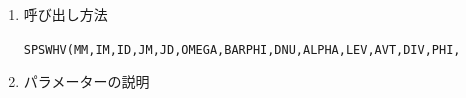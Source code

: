 \documentclass[a4j,fleqn]{jarticle}
\begin{document}
\begin{enumerate}
さて, $\Phi=\bar\Phi+\Phi'$と$\Phi$を平均部分と擾乱部分に分離すると,
上記の方程式系は以下のように書きかえられる:
\begin{equation}
\dot{q}=-\frac{\partial A}{\cos\varphi\partial\lambda}
-\frac{\partial(B\cos\varphi)}{\cos\varphi\partial\varphi}
+\frac{\nu}{\bar\Phi}\{2(\nabla^2+1)\hat\zeta_{\Phi'}
-\nabla^2(\Phi'\hat\zeta)\}
+\nu(\nabla^2+2)\hat\zeta,
\end{equation}
\begin{eqnarray}
\dot{D}=\frac{\partial B}{\cos\varphi\partial\lambda}
-\frac{\partial(A\cos\varphi)}{\cos\varphi\partial\varphi}
-\nabla^2(E+\frac{\nu}{\bar\Phi}\alpha\Phi'\hat D)
+\frac{\nu}{\bar\Phi}\{2(\nabla^2+1)\hat D_{\Phi'}\}\nonumber\\
-\nabla^2\Phi'+\nu\left\{(2-\alpha)\nabla^2+2\right\}\hat D,
\end{eqnarray}
\begin{equation}
\dot{\Phi'}=-D_{\Phi'}-\bar\Phi D.
\end{equation}
本サブルーチンは, 上記の$q,D,\Phi$のスペクトル展開係数
$q^m_n,D^m_n,\Phi^m_n$および$\bar\Phi,\nu,\alpha$を入力として,
$\dot{q},\dot{D},\dot{\Phi}$の非線形部分:
\begin{equation}
\dot{q}_{非線形}=-\frac{\partial A}{\cos\varphi\partial\lambda}
-\frac{\partial(B\cos\varphi)}{\cos\varphi\partial\varphi}
+\frac{\nu}{\bar\Phi}\{2(\nabla^2+1)\hat\zeta_{\Phi'}
-\nabla^2(\Phi'\hat\zeta)\},
\end{equation}
\begin{eqnarray}
\dot{D}_{非線形}=\frac{\partial B}{\cos\varphi\partial\lambda}
-\frac{\partial(A\cos\varphi)}{\cos\varphi\partial\varphi}
-\nabla^2(E+\frac{\nu}{\bar\Phi}\alpha\Phi'\hat D)
+\frac{\nu}{\bar\Phi}\{2(\nabla^2+1)\hat D_{\Phi'}\}
\end{eqnarray}
\begin{equation}
\dot{\Phi'}_{非線形}=-D_{\Phi'},
\end{equation}
の切断波数$M$までのスペクトル展開係数を求めるものである.

\item 呼び出し方法 

{\tt SPSWHV(MM,IM,ID,JM,JD,OMEGA,BARPHI,DNU,ALPHA,LEV,AVT,DIV,PHI,}\\
\hspace*{10em}{\tt DAVT,DDIV,DPHI,RN,IRM,IT,T,Y,IP,P,R,IA,A,Q,WS,WW)}
  
\item パラメーターの説明


\end{enumerate}
\end{document}
